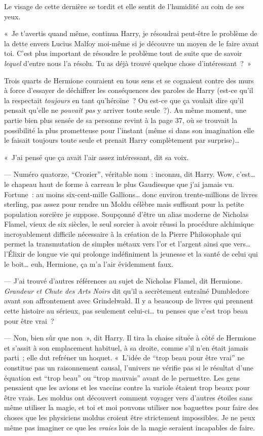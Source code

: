 Le visage de cette dernière se tordit et elle sentit de l'humidité au coin de ses yeux.

«~Je t'avertis quand même, continua Harry, je résoudrai peut-être le problème de la dette envers Lucius Malfoy moi-même si je découvre un moyen de le faire avant toi. C'est plus important de résoudre le problème tout de suite que de savoir \emph{lequel} d'entre nous l'a résolu. Tu as déjà trouvé quelque chose d'intéressant~?~»

Trois quarts de Hermione couraient en tous sens et se cognaient contre des murs à force d'essayer de déchiffrer les conséquences des paroles de Harry (est-ce qu'il la respectait \emph{toujours} en tant qu'héroïne~? Ou est-ce que ça voulait dire qu'il pensait qu'elle ne \emph{pouvait pas} y arriver toute seule~?). Au même moment, une partie bien plus sensée de sa personne revint à la page 37, où se trouvait la possibilité la plus prometteuse pour l'instant (même si dans son imagination elle le faisait toujours toute seule et prenait Harry complètement par surprise)…

«~J'ai pensé que ça avait l'air assez intéressant, dit sa voix.

--- Numéro quatorze, “Crozier”, véritable nom~: inconnu, dit Harry. Wow, c'est… le chapeau haut de forme à carreau le plus Gaudiesque que j'ai jamais vu. Fortune~: au moins six-cent-mille Gallions… donc environ trente-millions de livres sterling, pas assez pour rendre un Moldu célèbre mais suffisant pour la petite population sorcière je suppose. Soupçonné d'être un alias moderne de Nicholas Flamel, vieux de six siècles, le seul sorcier à avoir réussi la procédure alchimique incroyablement difficile nécessaire à la création de la Pierre Philosophale qui permet la transmutation de simples métaux vers l'or et l'argent ainsi que vers… l'Élixir de longue vie qui prolonge indéfiniment la jeunesse et la santé de celui qui le boit… euh, Hermione, ça m'a l'air évidemment faux.

--- J'ai trouvé d'autres références au sujet de Nicholas Flamel, dit Hermione. \emph{Grandeur et Chute des Arts Noirs} dit qu'il a secrètement entraîné Dumbledore avant son affrontement avec Grindelwald. Il y a beaucoup de livres qui prennent cette histoire au sérieux, pas seulement celui-ci… tu penses que c'est trop beau pour être vrai~?

--- Non, bien sûr que non~», dit Harry. Il tira la chaise située à côté de Hermione et s'assit à son emplacement habituel, à sa droite, comme s'il n'en était jamais parti~; elle dut refréner un hoquet. «~L'idée de “trop beau pour être vrai” ne constitue pas un raisonnement causal, l'univers ne vérifie pas si le résultat d'une équation est “trop beau” ou “trop mauvais” avant de le permettre. Les gens pensaient que les avions et les vaccins contre la variole étaient trop beaux pour être vrais. Les moldus ont découvert comment voyager vers d'autres étoiles sans même utiliser la magie, et toi et moi pouvons utiliser nos baguettes pour faire des choses que les physiciens moldus croient être strictement impossibles. Je ne peux même pas imaginer ce que les \emph{vraies} lois de la magie seraient incapables de faire.

